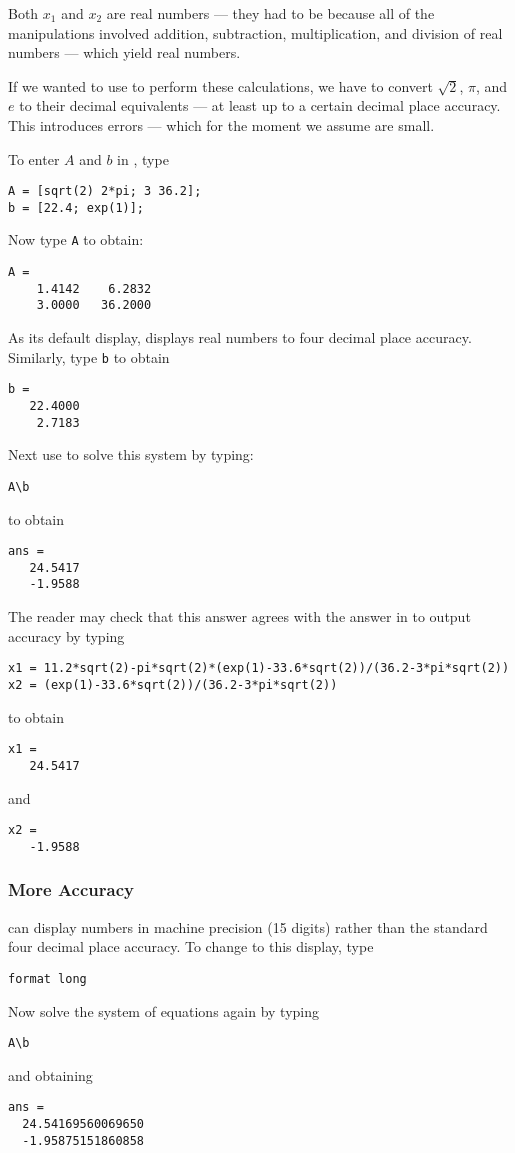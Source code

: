 \documentclass{ximera}
\begin{document}
Both $x_1$ and $x_2$ are real numbers --- they had to be because
all of the manipulations involved addition, subtraction,
multiplication, and division of real numbers --- which yield
real numbers.

If we wanted to use \Matlab to perform these calculations, we
have to convert $\sqrt{2}$, $\pi$, and $e$ to their
decimal equivalents --- at least up to a certain decimal place
accuracy. This introduces errors --- which for the moment we
assume are small.

To enter $A$ and $b$ in \Matlab, type
\begin{verbatim}
A = [sqrt(2) 2*pi; 3 36.2];
b = [22.4; exp(1)];
\end{verbatim}
Now type {\tt A} to obtain:
\begin{verbatim}
A =
    1.4142    6.2832
    3.0000   36.2000
\end{verbatim}
As its default display, \Matlab displays real numbers to four
decimal place accuracy.  Similarly, type {\tt b} to obtain
\begin{verbatim}
b =
   22.4000
    2.7183
\end{verbatim}


Next use \Matlab to solve this system by typing:
\begin{verbatim}
A\b
\end{verbatim}
to obtain
\begin{verbatim}
ans =
   24.5417
   -1.9588
\end{verbatim}

The reader may check that this answer agrees with the answer in
 to \Matlab output accuracy by typing
\begin{verbatim}
x1 = 11.2*sqrt(2)-pi*sqrt(2)*(exp(1)-33.6*sqrt(2))/(36.2-3*pi*sqrt(2))
x2 = (exp(1)-33.6*sqrt(2))/(36.2-3*pi*sqrt(2))
\end{verbatim}
to obtain
\begin{verbatim}
x1 =
   24.5417
\end{verbatim}
and
\begin{verbatim}
x2 =
   -1.9588
\end{verbatim}


\subsubsection*{More Accuracy}

\Matlab can display numbers in machine precision (15 digits) rather
than the standard four decimal place accuracy. To change to this
display, type
\begin{verbatim}
format long
\end{verbatim} 
Now solve the system of equations  again by typing
\begin{verbatim}
A\b
\end{verbatim}  \index{\computer!$\backslash$}
and obtaining
\begin{verbatim}
ans =
  24.54169560069650
  -1.95875151860858
\end{verbatim}
\end{document}
